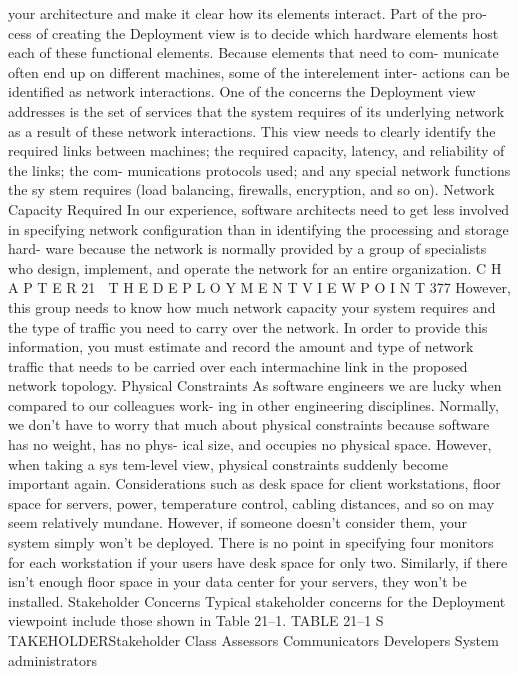 your architecture and make it clear how its elements interact. Part of the pro-
cess of creating the Deployment view is to decide which hardware elements
host each of these functional elements. Because elements that need to com-
municate often end up on different machines, some of the interelement inter-
actions can be identified as network interactions.
One of the concerns the Deployment view addresses is the set of services
that the system requires of its underlying network as a result of these network
interactions. This view needs to clearly identify the required links between
machines; the required capacity, latency, and reliability of the links; the com-
munications protocols used; and any special network functions the sy stem
requires (load balancing, firewalls, encryption, and so on).
Network Capacity Required
In our experience, software architects need to get less involved in specifying
network configuration than in identifying the processing and storage hard-
ware because the network is normally provided by a group of specialists who
design, implement, and operate the network for an entire organization.
C H A P T E R 21  T H E D E P L O Y M E N T V I E W P O I N T
 377
However, this group needs to know how much network capacity your system
requires and the type of traffic you need to carry over the network. In order to
provide this information, you must estimate and record the amount and type
of network traffic that needs to be carried over each intermachine link in the
proposed network topology.
Physical Constraints
As software engineers we are lucky when compared to our colleagues work-
ing in other engineering disciplines. Normally, we don’t have to worry that
much about physical constraints because software has no weight, has no phys-
ical size, and occupies no physical space. However, when taking a sys tem-level
view, physical constraints suddenly become important again.
Considerations such as desk space for client workstations, floor space for
servers, power, temperature control, cabling distances, and so on may seem
relatively mundane. However, if someone doesn’t consider them, your system
simply won’t be deployed. There is no point in specifying four monitors for
each workstation if your users have desk space for only two. Similarly, if
there isn’t enough floor space in your data center for your servers, they won’t
be installed.
Stakeholder Concerns
Typical stakeholder concerns for the Deployment viewpoint include those
shown in Table 21–1.
TABLE 21–1 S TAKEHOLDERStakeholder Class
Assessors
Communicators
Developers
System administrators
